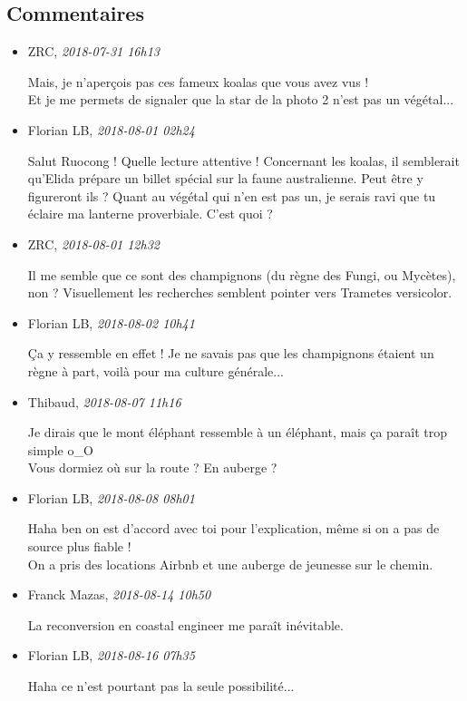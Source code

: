 \hypertarget{commentaires}{%
\subsection{Commentaires}\label{commentaires}}

\begin{itemize}
\item
  ZRC, \emph{2018-07-31 16h13}

  Mais, je n'aperçois pas ces fameux koalas que vous avez vus !\\
  Et je me permets de signaler que la star de la photo 2 n'est pas un
  végétal...
\item
  Florian LB, \emph{2018-08-01 02h24}

  Salut Ruocong ! Quelle lecture attentive ! Concernant les koalas, il
  semblerait qu'Elida prépare un billet spécial sur la faune
  australienne. Peut être y figureront ils ? Quant au végétal qui n'en
  est pas un, je serais ravi que tu éclaire ma lanterne proverbiale.
  C'est quoi ?
\item
  ZRC, \emph{2018-08-01 12h32}

  Il me semble que ce sont des champignons (du règne des Fungi, ou
  Mycètes), non ? Visuellement les recherches semblent pointer vers
  Trametes versicolor.
\item
  Florian LB, \emph{2018-08-02 10h41}

  Ça y ressemble en effet ! Je ne savais pas que les champignons étaient
  un règne à part, voilà pour ma culture générale...
\item
  Thibaud, \emph{2018-08-07 11h16}

  Je dirais que le mont éléphant ressemble à un éléphant, mais ça paraît
  trop simple o\_O\\
  Vous dormiez où sur la route ? En auberge ?
\item
  Florian LB, \emph{2018-08-08 08h01}

  Haha ben on est d'accord avec toi pour l'explication, même si on a pas
  de source plus fiable !\\
  On a pris des locations Airbnb et une auberge de jeunesse sur le
  chemin.
\item
  Franck Mazas, \emph{2018-08-14 10h50}

  La reconversion en coastal engineer me paraît inévitable.
\item
  Florian LB, \emph{2018-08-16 07h35}

  Haha ce n'est pourtant pas la seule possibilité...
\end{itemize}
